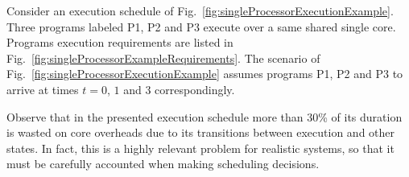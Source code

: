 
Consider an execution schedule of Fig.~\ref{fig:singleProcessorExecutionExample}. Three programs labeled P1, P2 and P3 execute over a same shared single core. Programs execution requirements are listed in Fig.~\ref{fig:singleProcessorExampleRequirements}. The scenario of Fig.~\ref{fig:singleProcessorExecutionExample} assumes programs P1, P2 and P3 to arrive at times $t=0$, $1$ and $3$ correspondingly.

Observe that in the presented execution schedule more than 30\% of its duration is wasted on core overheads due to its transitions between execution and other states. In fact, this is a highly relevant problem for realistic systems, so that it must be carefully accounted when making scheduling decisions.




